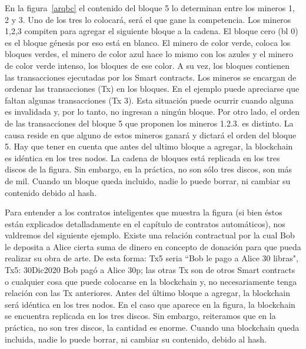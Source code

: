 \documentclass[12pt]{report} %
\begin{document}
	En la figura~\ref{arqbc} el contenido del bloque 5 lo determinan entre los mineros 1, 2 y 3. Uno de los tres lo colocará, será el que gane la competencia. Los mineros 1,2,3 compiten para agregar el siguiente bloque a la cadena. El bloque cero (bl 0) es el bloque génesis por eso está en blanco. El minero de color verde, coloca los bloques verdes, el minero de color azul hace lo mismo con los azules y el minero de color verde intenso, los bloques de ese color. A su vez, los bloques contienen las transacciones ejecutadas por los Smart contracts. Los mineros se encargan de ordenar las transacciones (Tx) en los bloques. En el ejemplo puede apreciarse que faltan algunas transacciones (Tx 3). Esta situación  puede ocurrir cuando alguna es invalidada y, por lo tanto, no ingresan a ningún bloque. Por otro lado, el orden de las transacciones del bloque 5 que proponen los mineros 1.2.3. es distinto. La causa reside en que alguno de estos mineros ganará y dictará el orden del bloque 5. Hay que tener en cuenta que antes del ultimo bloque a agregar, la blockchain es idéntica en los tres nodos. La cadena de bloques está replicada en los tres discos de la figura. Sin embargo, en la práctica, no son sólo tres discos, son más de mil. Cuando un bloque queda incluido, nadie lo puede borrar, ni cambiar su contenido debido al hash. 
	
Para entender a los contratos inteligentes que muestra la figura (si bien éstos están explicados detalladamente en el capítulo de contratos automáticos), nos valdremos del siguiente ejemplo. Existe una relación contractual por la cual Bob le deposita a Alice cierta suma de dinero en concepto de donación para que pueda realizar su obra de arte. De esta forma: Tx5 seria “Bob le pago a Alice 30 libras", Tx5:  30Dic2020 Bob pagó a Alice 30p; las otras Tx son de otros Smart contracts o cualquier cosa que puede colocarse en la blockchain y, no necesariamente tenga relación con las Tx anteriores. Antes del último bloque a agregar, la blockchain será idéntica en los tres nodos. En el caso que aparece en la figura, la blockchain se encuentra replicada en los tres discos. Sin embargo, reiteramos que en la práctica, no son tres discos, la cantidad es enorme. Cuando una blockchain queda incluida, nadie lo puede borrar, ni cambiar su contenido, debido al hash.
\end{document}
